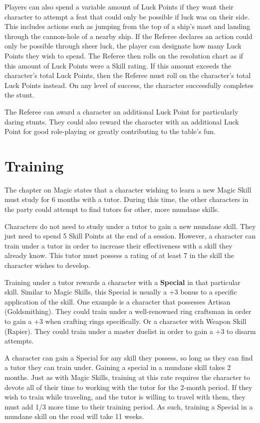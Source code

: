 \documentclass[oneside]{book}
\begin{document}
\begin{multicols}{2}
Players can also spend a variable amount of Luck Points if they want their character to attempt a feat that could only be possible if luck was on their side. This includes actions such as jumping from the top of a ship's mast and landing through the cannon-hole of a nearby ship. If the Referee declares an action could only be possible through sheer luck, the player can designate how many Luck Points they wish to spend. The Referee then rolls on the resolution chart as if this amount of Luck Points were a Skill rating. If this amount exceeds the character's total Luck Points, then the Referee must roll on the character's total Luck Points instead. On any level of success, the character successfully completes the stunt. 

The Referee can award a character an additional Luck Point for particularly daring stunts. They could also reward the character with an additional Luck Point for good role-playing or greatly contributing to the table's fun. 

\section{Training}

The chapter on Magic states that a character wishing to learn a new Magic Skill must study for 6 months with a tutor. During this time, the other characters in the party could attempt to find tutors for other, more mundane skills. 

Characters do not need to study under a tutor to gain a new mundane skill. They just need to spend 5 Skill Points at the end of a session. However, a character can train under a tutor in order to increase their effectiveness with a skill they already know. This tutor must possess a rating of at least 7 in the skill the character wishes to develop.

Training under a tutor rewards a character with a \textbf{Special} in that particular skill. Similar to Magic Skills, this Special is usually a +3 bonus to a specific application of the skill. One example is a character that possesses Artisan (Goldsmithing). They could train under a well-renowned ring craftsman in order to gain a +3 when crafting rings specifically. Or a character with Weapon Skill (Rapier). They could train under a master duelist in order to gain a +3 to disarm attempts. 

A character can gain a Special for any skill they possess, so long as they can find a tutor they can train under. Gaining a special in a mundane skill takes 2 months. Just as with Magic Skills, training at this rate requires the character to devote all of their time to working with the tutor for the 2-month period. If they wish to train while traveling, and the tutor is willing to travel with them, they must add 1/3 more time to their training period. As such, training a Special in a mundane skill on the road will take 11 weeks. 


\end{multicols}
\end{document}
